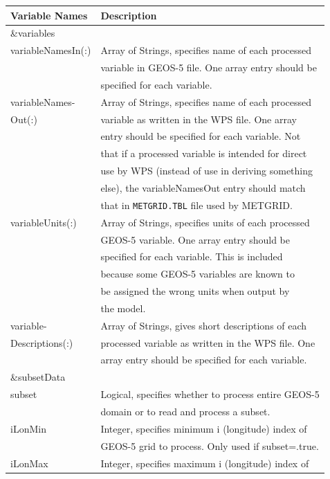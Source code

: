  \begin{tabular}{|l|l|} \hline
Variable Names & Description \\ \hline
 \&variables & \\ \hline
variableNamesIn(:) 
& Array of Strings, specifies name of each processed\\
 & variable  in GEOS-5 file. One array entry should be\\
 & specified for each variable. \\ \hline
variableNames-& Array of Strings, specifies name of each processed\\
Out(:)  & variable as written in the WPS file. One array \\
 & entry should be specified for each variable. Not \\
 & that if a processed variable is intended for direct\\
 & use by WPS (instead of use in deriving something\\
 & else), the variableNamesOut entry should match \\
 & that in \texttt{METGRID.TBL} file used by METGRID. \\ \hline
variableUnits(:) 
& Array of Strings, specifies units of each processed \\
 & GEOS-5 variable. One array entry should be \\
 & specified for each variable. This is included \\
 & because some GEOS-5 variables are known to \\
 & be assigned the wrong units when output by \\ 
 & the model. \\ \hline
variable- & Array of Strings, gives short descriptions of each \\
Descriptions(:)  & processed variable as written in the WPS file. One \\
 & array entry should be specified for each variable. \\ \hline
 \&subsetData & \\ \hline
subset 
& Logical, specifies whether to process entire GEOS-5 \\
 & domain or to read and process a subset. \\ \hline
iLonMin 
& Integer, specifies minimum i (longitude) index of \\
 & GEOS-5 grid to process. Only used if subset=.true. \\ \hline
iLonMax 
& Integer, specifies maximum i (longitude) index of \\

\end{tabular}
